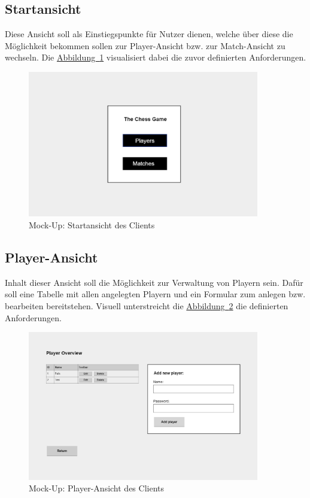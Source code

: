 \subsection{Startansicht}\label{sec:startView}
Diese Ansicht soll als Einstiegspunkte für Nutzer dienen, welche über diese die
Möglichkeit bekommen sollen zur Player-Ansicht bzw. zur Match-Ansicht zu wechseln. Die \hyperref[fig:startView]{Abbildung~\ref{fig:startView}} visualisiert dabei die zuvor definierten Anforderungen.
\begin{figure}[htb]
	\includegraphics[width=0.9\textwidth]{images/start-view.png}
	\caption{Mock-Up: Startansicht des Clients}
	\label{fig:startView}
\end{figure}

\subsection{Player-Ansicht}\label{sec:playerView}
Inhalt dieser Ansicht soll die Möglichkeit zur Verwaltung von Playern sein. Dafür soll eine Tabelle mit allen angelegten Playern und ein Formular zum anlegen bzw. bearbeiten bereitstehen. Visuell unterstreicht die \hyperref[fig:playerView]{Abbildung~\ref{fig:playerView}} die definierten Anforderungen.
\begin{figure}[htb]
	\includegraphics[width=0.9\textwidth]{images/player-view.png}
	\caption{Mock-Up: Player-Ansicht des Clients}
	\label{fig:playerView}
\end{figure}

